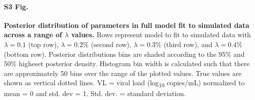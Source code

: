 \documentclass[10pt,letterpaper]{article}
\begin{document}
\paragraph*{S3 Fig.}
\label{full_simulation_sensitivity_lambda}
{\bf Posterior distribution of parameters in full model fit to simulated data across a range of $\lambda$ values.} Rows represent model to fit to simulated data with $\lambda=0.1$ (top row), $\lambda=0.2\%$ (second row), $\lambda=0.3\%$ (third row), and $\lambda=0.4\%$ (bottom row). Posterior distributions bins are shaded according to the 95\% and 50\% higheset posterior density. Histogram bin width is calculated such that there are approximately 50 bins over the range of the plotted values. True values are shown as vertical dotted lines. VL = viral load (log\textsubscript{10} copies/mL) normalized to mean = 0 and std. dev = 1. Std. dev. = standard deviation.  
\end{document}
